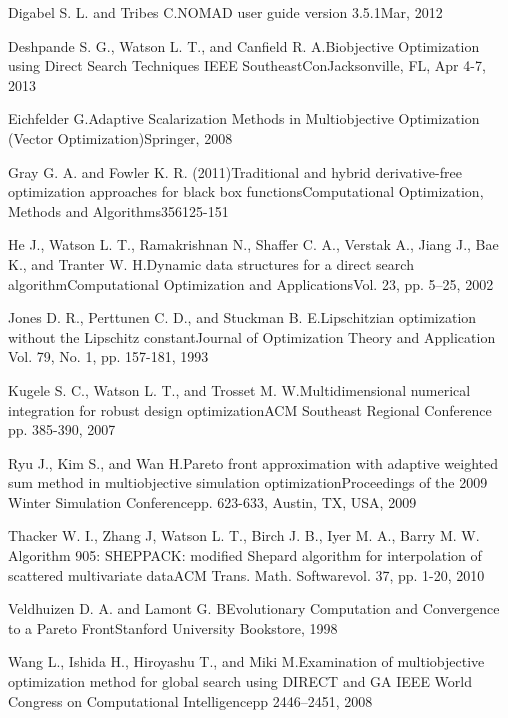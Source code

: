 {Digabel S. L. and Tribes C.}{NOMAD user guide version 3.5.1}{Mar, 2012}

{Deshpande S. G., Watson L. T., and Canfield R. A.}{Biobjective Optimization 
using Direct Search Techniques }{IEEE SoutheastCon}{Jacksonville, FL, Apr 4-7, 
2013}

{Eichfelder G.}{Adaptive Scalarization Methods in Multiobjective Optimization 
(Vector Optimization)}{Springer, 2008}

{Gray G. A. and Fowler K. R. (2011)}{Traditional and hybrid derivative-free 
optimization approaches for black box functions}{Computational Optimization, 
Methods and Algorithms}{356}{125-151}

{He J., Watson L. T., Ramakrishnan N., Shaffer C. A., Verstak A., Jiang J., 
Bae K., and Tranter W. H.}{Dynamic data structures for a direct search 
algorithm}{Computational Optimization and Applications}{Vol. 23, pp. 5--25, 
2002} 

{Jones D. R., Perttunen  C. D., and Stuckman B. E.}{Lipschitzian optimization
without the Lipschitz constant}{Journal of Optimization Theory and Application} 
{Vol. 79, No. 1, pp. 157-181, 1993}

{Kugele S. C., Watson L. T., and Trosset M. W.}{Multidimensional numerical 
integration for robust design optimization}{ACM Southeast Regional Conference}
{pp. 385-390, 2007}

{Ryu J., Kim S., and Wan H.}{Pareto front approximation with adaptive weighted 
sum method in multiobjective simulation optimization}{Proceedings of the 2009
Winter Simulation Conference}{pp. 623-633, Austin, TX, USA, 2009}

{Thacker W. I., Zhang J, Watson L. T., Birch J. B., Iyer M. A., Barry M. W.}
{Algorithm 905: SHEPPACK: modified Shepard algorithm for interpolation of 
scattered multivariate data}{ACM Trans. Math. Software}{vol. 37, pp. 1-20, 
2010}

{Veldhuizen D. A. and Lamont G. B}{Evolutionary Computation and 
Convergence to a Pareto Front}{Stanford University Bookstore, 1998}

{Wang L., Ishida H., Hiroyashu T., and Miki M.}{Examination of 
multiobjective optimization method for global search using DIRECT and GA}
{IEEE World Congress on Computational Intelligence}{pp 2446--2451, 2008}

\bye
